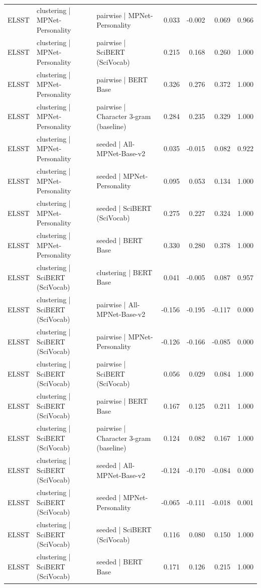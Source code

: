 \begin{table}[ht]
\begin{tabular}{lllrrrr}
ELSST & clustering | MPNet-Personality & pairwise | MPNet-Personality & 0.033 & -0.002 & 0.069 & 0.966 \\
ELSST & clustering | MPNet-Personality & pairwise | SciBERT (SciVocab) & 0.215 & 0.168 & 0.260 & 1.000 \\
ELSST & clustering | MPNet-Personality & pairwise | BERT Base & 0.326 & 0.276 & 0.372 & 1.000 \\
ELSST & clustering | MPNet-Personality & pairwise | Character 3-gram (baseline) & 0.284 & 0.235 & 0.329 & 1.000 \\
ELSST & clustering | MPNet-Personality & seeded | All-MPNet-Base-v2 & 0.035 & -0.015 & 0.082 & 0.922 \\
ELSST & clustering | MPNet-Personality & seeded | MPNet-Personality & 0.095 & 0.053 & 0.134 & 1.000 \\
ELSST & clustering | MPNet-Personality & seeded | SciBERT (SciVocab) & 0.275 & 0.227 & 0.324 & 1.000 \\
ELSST & clustering | MPNet-Personality & seeded | BERT Base & 0.330 & 0.280 & 0.378 & 1.000 \\
ELSST & clustering | SciBERT (SciVocab) & clustering | BERT Base & 0.041 & -0.005 & 0.087 & 0.957 \\
ELSST & clustering | SciBERT (SciVocab) & pairwise | All-MPNet-Base-v2 & -0.156 & -0.195 & -0.117 & 0.000 \\
ELSST & clustering | SciBERT (SciVocab) & pairwise | MPNet-Personality & -0.126 & -0.166 & -0.085 & 0.000 \\
ELSST & clustering | SciBERT (SciVocab) & pairwise | SciBERT (SciVocab) & 0.056 & 0.029 & 0.084 & 1.000 \\
ELSST & clustering | SciBERT (SciVocab) & pairwise | BERT Base & 0.167 & 0.125 & 0.211 & 1.000 \\
ELSST & clustering | SciBERT (SciVocab) & pairwise | Character 3-gram (baseline) & 0.124 & 0.082 & 0.167 & 1.000 \\
ELSST & clustering | SciBERT (SciVocab) & seeded | All-MPNet-Base-v2 & -0.124 & -0.170 & -0.084 & 0.000 \\
ELSST & clustering | SciBERT (SciVocab) & seeded | MPNet-Personality & -0.065 & -0.111 & -0.018 & 0.001 \\
ELSST & clustering | SciBERT (SciVocab) & seeded | SciBERT (SciVocab) & 0.116 & 0.080 & 0.150 & 1.000 \\
ELSST & clustering | SciBERT (SciVocab) & seeded | BERT Base & 0.171 & 0.126 & 0.215 & 1.000 \\

\end{tabular}
\end{table}
